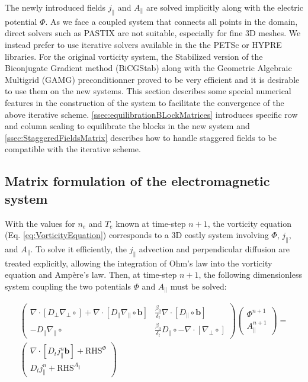 The newly introduced fields $j_\parallel$ and $A_\parallel$ are solved implicitly along with the electric potential $\Phi$. As we face a coupled system that connects all points in the domain, direct solvers such as PASTIX are not suitable, especially for fine 3D meshes. We instead prefer to use iterative solvers available in the the PETSc or HYPRE libraries. For the original vorticity system, the Stabilized version of the Biconjugate Gradient method (BiCGStab) along with the Geometric Algebraic Multigrid (GAMG) preconditionner proved to be very efficient and it is desirable to use them on the new systems. This section describes some special numerical features in the construction of the system to facilitate the convergence of the above iterative scheme. \autoref{ssec:equilibrationBLockMatrices} introduces specific row and column scaling to equilibrate the blocks in the new system and \autoref{ssec:StaggeredFieldsMatrix} describes how to handle staggered fields to be compatible with the iterative scheme.

\subsection{Matrix formulation of the electromagnetic system}

With the values for $n_e$ and $T_e$ known at time-step $n+1$, the vorticity equation (Eq. \ref{eq:VorticityEquation}) corresponds to a 3D costly system involving $\Phi$, $j_\parallel$, and $A_\parallel$. To solve it efficiently, the $j_\parallel$ advection and perpendicular diffusion are treated explicitly, allowing the integration of Ohm's law into the vorticity equation and Ampère's law. Then, at time-step $n+1$, the following dimensionless system coupling the two potentials $\Phi$ and $A_\parallel$ must be solved: \newline

\begin{align}
		\label{eq:impl_implicitVorticitySystem}
	\begin{pmatrix}
		\nabla \cdot \left[ D_\perp \nabla_\perp \circ \right] + \nabla \cdot \left[ D_\parallel \nabla_\parallel \circ \mathbf{b} \right]  
		& \frac{\beta_0}{\delta_t} \nabla \cdot \left[ D_\parallel \circ \mathbf{b} \right] \\
		-D_\parallel \nabla_\parallel \circ &
		\frac{\beta_0}{\delta_t} D_\parallel \circ - \nabla \cdot \left[ \nabla_\perp \circ \right]
	\end{pmatrix}
	\begin{pmatrix}
		\Phi^{n+1} \\ A_\parallel^{n+1}
	\end{pmatrix} 
	= \nonumber \\
	\begin{pmatrix}
		\nabla \cdot \left[ D_t j^{n}_\parallel \mathbf{b} \right] + \text{RHS}^\Phi \\
		D_t j^{n}_\parallel + \text{RHS}^{A_\parallel}
	\end{pmatrix}
\end{align}

